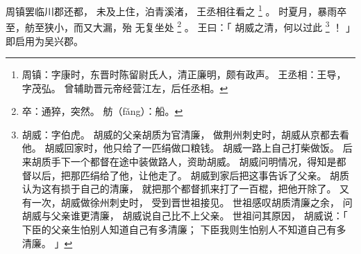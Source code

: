 
\switchcolumn*[\section{}]

周镇罢临川郡还都，
未及上住，泊青溪渚，
王丞相往看之%
\footnote{%
    周镇：字康时，东晋时陈留尉氏人，清正廉明，颇有政声。
    王丞相：王导，字茂弘。
            曾辅助晋元帝经营江左，后任丞相。
}%
。
时夏月，暴雨卒至，舫至狭小，而又大漏，殆
无复坐处%
\footnote{%
    卒：通猝，突然。
    舫（fǎng）：船。
}%
。
王曰：「
    胡威之清，何以过此%
    \footnote{%
        胡威：字伯虎。
              胡威的父亲胡质为官清廉，
              做荆州刺史时，胡威从京都去看他。
              胡威回家时，他只给了一匹绢做口粮钱。
              胡威一路上自己打柴做饭。
              后来胡质手下一个都督在途中装做路人，资助胡威。
              胡威问明情况，得知是都督以后，把那匹绢给了他，让他走了。
              胡威到家后把这事告诉了父亲。
              胡质认为这有损于自己的清廉，
              就把那个都督抓来打了一百棍，把他开除了。
              又有一次，胡威做徐州刺史时，
              受到晋世祖接见。
              世祖感叹胡质清廉之余，
              问胡威与父亲谁更清廉，
              胡威说自己比不上父亲。
              世祖问其原因，
              胡威说：「
                  下臣的父亲生怕别人知道自己有多清廉；
                  下臣我则生怕别人不知道自己有多清廉。
              」
    }%
    ！
」
即启用为吴兴郡。

\switchcolumn


